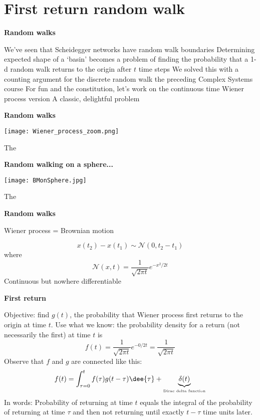 \section{First return random walk}

\begin{frame}[label=1]
  \textbf{Random walks}

  
   We've seen that Scheidegger networks
    have random walk boundaries\cite{scheidegger1967a,scheidegger1991a} 
   Determining expected shape of a `basin' becomes
    a problem of finding the probability that a 1-d random walk
    returns to the origin after $t$ time steps
   We solved this with a counting argument for
    the discrete random walk the preceding Complex Systems course
   For fun and the constitution, 
    let's work on the continuous time 
    Wiener process version
   A classic, delightful problem
  


\begin{frame}[label=]
  \textbf{Random walks}

  \texttt{[image: Wiener\_process\_zoom.png]}

  The 


\begin{frame}[label=]
  \textbf{Random walking on a sphere...}

  \texttt{[image: BMonSphere.jpg]}

  The 


\begin{frame}[label=]
  \textbf{Random walks}

  
   Wiener process = Brownian motion
   
    $$
    x(t_2) - x(t_1) \sim \mathcal{N}(0,t_2-t_1)
    $$
    where 
    $$
    \mathcal{N}(x,t) = \frac{1}{\sqrt{2\pi t} } e^{-x^2/2t}
    $$
   Continuous but nowhere differentiable
  



\begin{frame}[label=]
  \textbf{First return}

  
   \alert{Objective:} find $g(t)$, the probability
    that Wiener process first returns to the origin at time $t$.
   Use what we know: the probability density for
    \alert{a return} (not necessarily the first) at time $t$ is 
    $$
    f(t) = \frac{1}{\sqrt{2\pi t}} e^{-0/2t} = \frac{1}{\sqrt{2\pi t}}
    $$
   Observe that $f$ and $g$ are connected like this:
    $$
    f(t) = \int_{\tau=0}^{t} f(\tau) g(t - \tau) \dee{\tau} + \underbrace{\delta(t)}_{\mbox{\tiny Dirac delta function}}
    $$
   In words: Probability of returning at time $t$ equals
    the integral of the probability of returning at time $\tau$
    and then not returning until exactly $t-\tau$ time units later.
  



\end{frame}
\end{frame}
\end{frame}
\end{frame}
\end{frame}
